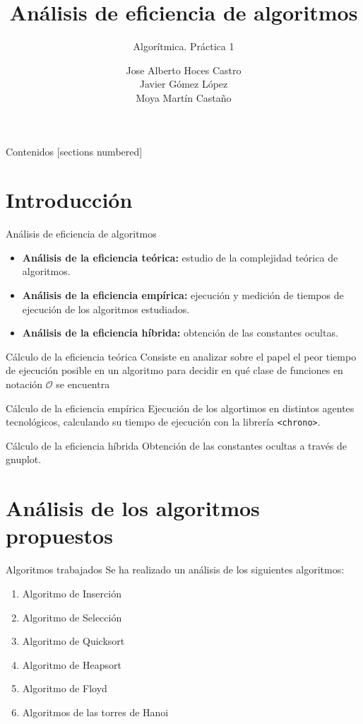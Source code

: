 \documentclass[10pt, xcolor=table]{beamer}
\title{Análisis de eficiencia de algoritmos}
\subtitle{Algorítmica. \alert{Práctica 1}}
\date{}
\author{Jose Alberto Hoces Castro\\Javier Gómez López\\Moya Martín Castaño\\[4pt]}
\begin{document}
\maketitle

\begin{frame}{Contenidos}
	[sections numbered]
	\tableofcontents[]
\end{frame}

\section{Introducción}
\begin{frame}[fragile]{Análisis de eficiencia de algoritmos}
	\begin{itemize}
		\item \textbf{Análisis de la eficiencia teórica:} estudio de la complejidad teórica de algoritmos.
		\item \textbf{Análisis de la eficiencia empírica:} ejecución y medición de tiempos de ejecución de los algoritmos estudiados.
		\item \textbf{Análisis de la eficiencia híbrida:} obtención de las constantes ocultas.
	\end{itemize}
\end{frame}

\begin{frame}[fragile]{Cálculo de la eficiencia teórica}
Consiste en analizar sobre el papel el peor tiempo de ejecución posible en un algoritmo para decidir en qué clase de funciones en notación \(\mathcal{O}\) se encuentra
\end{frame}

\begin{frame}[fragile]{Cálculo de la eficiencia empírica}
Ejecución de los algortimos en distintos agentes tecnológicos, calculando su tiempo de ejecución con la librería \texttt{<chrono>}.
\end{frame}

\begin{frame}[fragile]{Cálculo de la eficiencia híbrida}
Obtención de las constantes ocultas a través de gnuplot.
\end{frame}

\section{Análisis de los algoritmos propuestos}

\begin{frame}[fragile]{Algoritmos trabajados}
Se ha realizado un análisis de los siguientes algoritmos:
\begin{enumerate}
	\item Algoritmo de Inserción
	\item Algoritmo de Selección
	\item Algoritmo de Quicksort
	\item Algoritmo de Heapsort
	\item Algoritmo de Floyd
	\item Algoritmos de las torres de Hanoi
\end{enumerate}
\end{frame}
\end{document}
